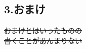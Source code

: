 \documentclass[b5paper,9pt,platex,dvipdfmx]{jsarticle}
\begin{document}
\begin{multicols*}{3}
\part*{3.おまけ}
\sout{おまけとはいったものの\\書くことがあんまりない}\\




\end{multicols*}
\end{document}
